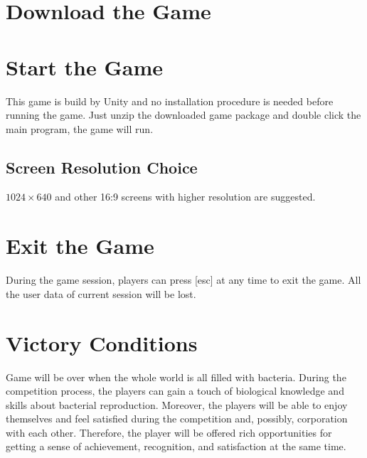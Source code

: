 \documentclass[12pt,a4paper,twoside]{scrartcl}
\begin{document}
\section{Download the Game}

\section{Start the Game}
This game is build by Unity and no installation procedure is needed before running the game. Just unzip the downloaded game package and double click the main program, the game will run.

\subsection{Screen Resolution Choice}

$1024\times640$ and other 16:9 screens with higher resolution are suggested. 

\section{Exit the Game}
During the game session, players can press [esc] at any time to exit the game. All the user data of current session will be lost.

\section{Victory Conditions}
Game will be over when the whole world is all filled with bacteria. During the competition process, the players can gain a touch of biological knowledge and skills about bacterial reproduction. Moreover, the players will be able to enjoy themselves and feel satisfied during the competition and, possibly, corporation with each other. Therefore, the player will be offered rich opportunities for getting a sense of achievement, recognition, and satisfaction at the same time.
\end{document}
